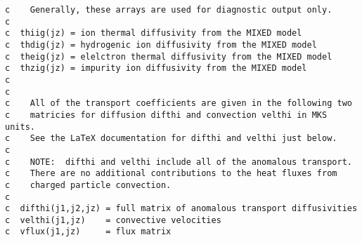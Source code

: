 \begin{verbatim}
c    Generally, these arrays are used for diagnostic output only.
c
c  thiig(jz) = ion thermal diffusivity from the MIXED model
c  thdig(jz) = hydrogenic ion diffusivity from the MIXED model
c  theig(jz) = elelctron thermal diffusivity from the MIXED model
c  thzig(jz) = impurity ion diffusivity from the MIXED model
c	    
c
c    All of the transport coefficients are given in the following two
c    matricies for diffusion difthi and convection velthi in MKS units.
c    See the LaTeX documentation for difthi and velthi just below.
c
c    NOTE:  difthi and velthi include all of the anomalous transport.
c    There are no additional contributions to the heat fluxes from
c    charged particle convection.
c
c  difthi(j1,j2,jz) = full matrix of anomalous transport diffusivities
c  velthi(j1,jz)    = convective velocities
c  vflux(j1,jz)     = flux matrix
\end{verbatim}

